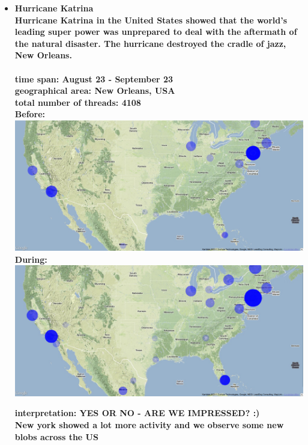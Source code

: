 \documentclass[11pt,a4paper,english]{article}
\begin{document}
\begin{itemize}
						
				\item \bf Hurricane Katrina \rm
					\\ Hurricane Katrina in the United States showed that the world's leading super power was unprepared to deal with the aftermath of the natural disaster. The hurricane destroyed the cradle of jazz, New Orleans. 
					\\\\ \bf time span: \rm August 23 - September 23
					\\ \bf geographical area: \rm New Orleans, USA
					\\ \bf total number of threads: \rm 4108
					\\ \bf Before: \rm
					\includegraphics[width=130mm]{img/pre-katrina}
					\\ \bf During: \rm
					\includegraphics[width=130mm]{img/post-katrina}
					
					\bf interpretation: \rm YES OR NO - ARE WE IMPRESSED? :)
					\\ New york showed a lot more activity and we observe some new blobs across the US
					
					
												
				\end{itemize}
			
\end{document}
